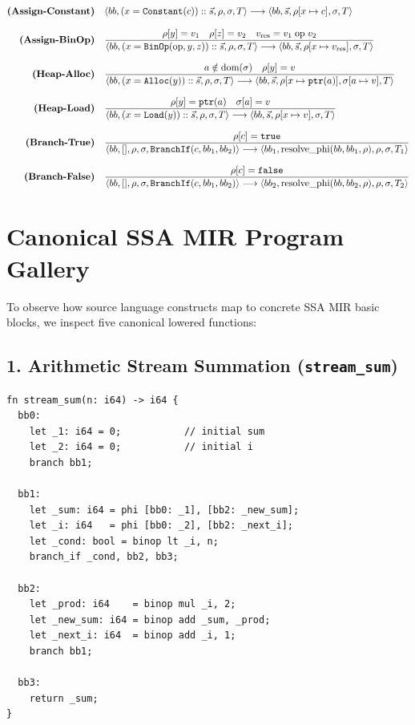 \begin{align}
\text{\bf (Assign-Constant)} \quad & \langle bb, (x = \mathtt{Constant}(c)) :: \vec{s}, \rho, \sigma, T \rangle \longrightarrow \langle bb, \vec{s}, \rho[x \mapsto c], \sigma, T \rangle \\[0.8em]
\text{\bf (Assign-BinOp)} \quad & \frac{\rho[y] = v_1 \quad \rho[z] = v_2 \quad v_{\text{res}} = v_1 \;\text{op}\; v_2}{\langle bb, (x = \mathtt{BinOp}(\text{op}, y, z)) :: \vec{s}, \rho, \sigma, T \rangle \longrightarrow \langle bb, \vec{s}, \rho[x \mapsto v_{\text{res}}], \sigma, T \rangle} \\[0.8em]
\text{\bf (Heap-Alloc)} \quad & \frac{a \notin \text{dom}(\sigma) \quad \rho[y] = v}{\langle bb, (x = \mathtt{Alloc}(y)) :: \vec{s}, \rho, \sigma, T \rangle \longrightarrow \langle bb, \vec{s}, \rho[x \mapsto \mathtt{ptr}(a)], \sigma[a \mapsto v], T \rangle} \\[0.8em]
\text{\bf (Heap-Load)} \quad & \frac{\rho[y] = \mathtt{ptr}(a) \quad \sigma[a] = v}{\langle bb, (x = \mathtt{Load}(y)) :: \vec{s}, \rho, \sigma, T \rangle \longrightarrow \langle bb, \vec{s}, \rho[x \mapsto v], \sigma, T \rangle} \\[0.8em]
\text{\bf (Branch-True)} \quad & \frac{\rho[c] = \mathtt{true}}{\langle bb, [], \rho, \sigma, \mathtt{BranchIf}(c, bb_1, bb_2) \rangle \longrightarrow \langle bb_1, \text{resolve\_phi}(bb, bb_1, \rho), \rho, \sigma, T_1 \rangle} \\[0.8em]
\text{\bf (Branch-False)} \quad & \frac{\rho[c] = \mathtt{false}}{\langle bb, [], \rho, \sigma, \mathtt{BranchIf}(c, bb_1, bb_2) \rangle \longrightarrow \langle bb_2, \text{resolve\_phi}(bb, bb_2, \rho), \rho, \sigma, T_2 \rangle}
\end{align}

\section{Canonical SSA MIR Program Gallery}
\label{sec:ir:gallery}

To observe how source language constructs map to concrete SSA MIR basic blocks, we inspect five canonical lowered functions:

\subsection{1. Arithmetic Stream Summation (\texttt{stream\_sum})}
\begin{lstlisting}[caption={SSA MIR for \texttt{stream\_sum}.}]
fn stream_sum(n: i64) -> i64 {
  bb0:
    let _1: i64 = 0;           // initial sum
    let _2: i64 = 0;           // initial i
    branch bb1;

  bb1:
    let _sum: i64 = phi [bb0: _1], [bb2: _new_sum];
    let _i: i64   = phi [bb0: _2], [bb2: _next_i];
    let _cond: bool = binop lt _i, n;
    branch_if _cond, bb2, bb3;

  bb2:
    let _prod: i64    = binop mul _i, 2;
    let _new_sum: i64 = binop add _sum, _prod;
    let _next_i: i64  = binop add _i, 1;
    branch bb1;

  bb3:
    return _sum;
}
\end{lstlisting}

